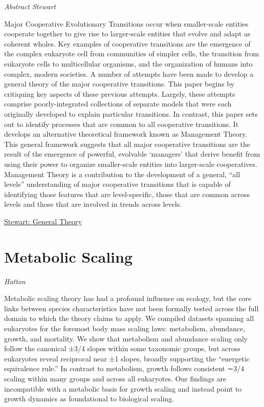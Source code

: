 \documentclass[
]{book}
\begin{document}
\emph{Abstract Stewart}

Major Cooperative Evolutionary Transitions occur when smaller-scale entities cooperate together to give rise to larger-scale entities that evolve and adapt as coherent wholes. Key examples of cooperative transitions are the emergence of the complex eukaryote cell from communities of simpler cells, the transition from eukaryote cells to multicellular organisms, and the organization of humans into complex, modern societies. A number of attempts have been made to develop a general theory of the major cooperative transitions. This paper begins by critiquing key aspects of these previous attempts. Largely, these attempts comprise poorly-integrated collections of separate models that were each originally developed to explain particular transitions. In contrast, this paper sets out to identify processes that are common to all cooperative transitions. It develops an alternative theoretical framework known as Management Theory. This general framework suggests that all major cooperative transitions are the result of the emergence of powerful, evolvable `managers' that derive benefit from using their power to organize smaller-scale entities into larger-scale cooperatives. Management Theory is a contribution to the development of a general, ``all levels'' understanding of major cooperative transitions that is capable of identifying those features that are level-specific, those that are common across levels and those that are involved in trends across levels.

\href{https://www.sciencedirect.com/science/article/pii/S030326472030126X}{Stewart: General Theory}

\hypertarget{metabolic-scaling}{%
\section{Metabolic Scaling}\label{metabolic-scaling}}

\emph{Hatton}

Metabolic scaling theory has had a profound influence on ecology, but the core links between species characteristics have not been formally tested across the full domain to which the theory claims to apply. We compiled datasets spanning all eukaryotes for the foremost body mass scaling laws: metabolism, abundance, growth, and mortality. We show that metabolism and abundance scaling only follow the canonical ±3/4 slopes within some taxonomic groups, but across eukaryotes reveal reciprocal near ±1 slopes, broadly supporting the ``energetic equivalence rule.'' In contrast to metabolism, growth follows consistent ∼3/4 scaling within many groups and across all eukaryotes. Our findings are incompatible with a metabolic basis for growth scaling and instead point to growth dynamics as foundational to biological scaling.
\end{document}
